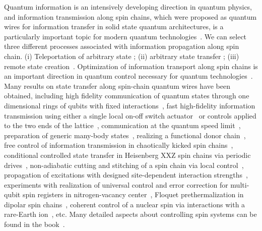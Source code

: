 \documentclass[pra,preprint,showpacs]{revtex4-1}
\begin{document}
Quantum information is an intensively developing direction in quantum physics, and information transmission along spin chains, which were proposed as quantum wires for information transfer in solid state quantum architectures, is a particularly important topic for modern quantum technologies~\cite{Schleich2016,Acin2018}. We can select three different processes  associated with information propagation along spin chain. (i) Teleportation of arbitrary state \cite{BBCJPW,BPMEWZ,BBMHP}; (ii) arbitrary state transfer \cite{Bose,CDEL,KS,GKMT,GMT,ZASO,ZASO2,ZenchukJPA2012}; (iii) remote state creation~\cite{PBGWK,PBGWK2,DLMRKBPVZBW,PSB,LH,Z_2014,BZ_2015}. Optimization of information transport along spin chains is an important direction in quantum control necessary for quantum technologies~\cite{Koch2022}. {Many results on state transfer along spin-chain quantum wires have been obtained, including high fidelity communication of quantum states through one dimensional rings of qubits
with fixed interactions~\cite{Osborne2004}, fast high-fidelity information transmission using either a single local on-off switch actuator~\cite{SchirmerPRA2009} or controls applied to the two ends of the lattice~\cite{Ashhab2015}, communication at the quantum speed limit~\cite{MurphyPRA2010,Ashhab2012,OsendaPLA2021}, preparation of generic many-body states~\cite{MorigiPRL2015}, realizing a functional donor chain~\cite{Mohiyaddin2016}, free control of information transmission in chaotically kicked spin chains~\cite{AubourgJPB2016}, conditional controlled state transfer in Heisenberg XXZ spin chains via periodic drives~\cite{ShanSciRep2018}, non-adiabatic cutting and stitching of a spin chain via local control~\cite{PyshkinNJP2018}, propagation of excitations with designed site-dependent interaction strengths~\cite{FerronPS2022}, experiments with realization of universal control and error correction for multi-qubit spin registers in nitrogen-vacancy center~\cite{Taminiau2014},  Floquet prethermalization in dipolar spin chains~\cite{Peng2021}, coherent control of a nuclear spin via interactions with a rare-Earth ion~\cite{Uysal2023}, etc.} Many detailed aspects about controlling spin systems can be found in the book~\cite{KuprovBook}.
\end{document}
